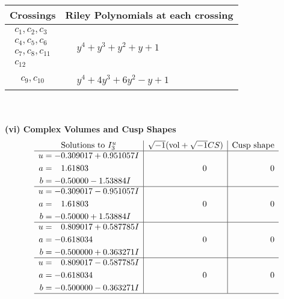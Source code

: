 \documentclass[1p]{elsarticle_modified}
\theoremstyle{definition}
\newcommand{\I}{\sqrt{-1}}
\begin{document}
\begin{tabular}{m{50pt}|m{274pt}}
Crossings & \hspace{64pt}Riley Polynomials at each crossing \\
\hline $$\begin{aligned}c_{1},c_{2},c_{3}\\c_{4},c_{5},c_{6}\\c_{7},c_{8},c_{11}\\c_{12}\end{aligned}$$&$\begin{aligned}
&y^4+y^3+y^2+y+1
\end{aligned}$\\
\hline $$\begin{aligned}c_{9},c_{10}\end{aligned}$$&$\begin{aligned}
&y^4+4 y^3+6 y^2- y+1
\end{aligned}$\\
\hline
\end{tabular}\\~\\
\newpage\flushleft \textbf{(vi) Complex Volumes and Cusp Shapes}
$$\begin{array}{c|c|c}  
\text{Solutions to }I^u_{3}& \I (\text{vol} + \sqrt{-1}CS) & \text{Cusp shape}\\
 \hline 
\begin{aligned}
u &= -0.309017 + 0.951057 I \\
a &= \phantom{-}1.61803\phantom{ +0.000000I} \\
b &= -0.50000 - 1.53884 I\end{aligned}
 & \phantom{-0.000000 } 0 & \phantom{-0.000000 } 0 \\ \hline\begin{aligned}
u &= -0.309017 - 0.951057 I \\
a &= \phantom{-}1.61803\phantom{ +0.000000I} \\
b &= -0.50000 + 1.53884 I\end{aligned}
 & \phantom{-0.000000 } 0 & \phantom{-0.000000 } 0 \\ \hline\begin{aligned}
u &= \phantom{-}0.809017 + 0.587785 I \\
a &= -0.618034\phantom{ +0.000000I} \\
b &= -0.500000 + 0.363271 I\end{aligned}
 & \phantom{-0.000000 } 0 & \phantom{-0.000000 } 0 \\ \hline\begin{aligned}
u &= \phantom{-}0.809017 - 0.587785 I \\
a &= -0.618034\phantom{ +0.000000I} \\
b &= -0.500000 - 0.363271 I\end{aligned}
 & \phantom{-0.000000 } 0 & \phantom{-0.000000 } 0\\
 \hline 
 \end{array}$$\newpage
\end{document}
